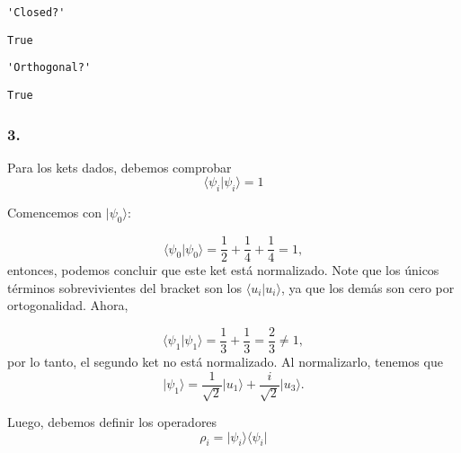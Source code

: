 \documentclass[11pt]{article}
\begin{document}
    
    
    \begin{verbatim}
'Closed?'
    \end{verbatim}

    
    
    \begin{verbatim}
True
    \end{verbatim}

    
    
    \begin{verbatim}
'Orthogonal?'
    \end{verbatim}

    
    
    \begin{verbatim}
True
    \end{verbatim}

    
    \hypertarget{section}{%
\subsubsection{3.}\label{section}}

Para los kets dados, debemos comprobar
\[\langle \psi_i\lvert\psi_i\rangle = 1\]

Comencemos con \(\lvert\psi_0\rangle\):

\[\langle \psi_0\lvert\psi_0\rangle = \frac{1}{2}+\frac{1}{4}+\frac{1}{4} = 1,\]
entonces, podemos concluir que este ket está normalizado. Note que los
únicos términos sobrevivientes del bracket son los
\(\langle u_i\lvert u_i\rangle\), ya que los demás son cero por
ortogonalidad. Ahora,

\[\langle \psi_1\lvert\psi_1\rangle = \frac{1}{3} + \frac{1}{3} = \frac{2}{3} \neq 1,\]
por lo tanto, el segundo ket no está normalizado. Al normalizarlo,
tenemos que
\[\lvert\psi_1\rangle = \frac{1}{\sqrt{2}}\lvert u_1\rangle + \frac{i}{\sqrt{2}}\lvert u_3\rangle.\]

Luego, debemos definir los operadores
\[\rho_i = \lvert\psi_i\rangle\langle\psi_i\rvert\]
\end{document}
